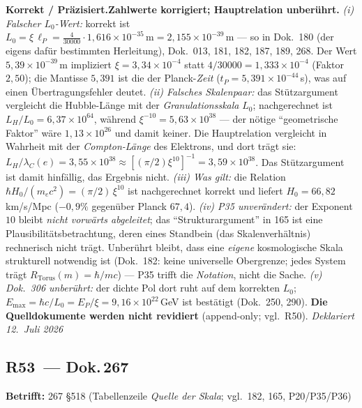 \smallskip\noindent\textbf{Korrekt / Präzisiert.}\quad \textbf{Zahlwerte korrigiert; Hauptrelation unberührt.} \emph{(i) Falscher $L_0$-Wert:} korrekt ist $L_0 = \xi\,\ell_P = \tfrac{4}{30000}\cdot 1{,}616\times10^{-35}\,\text{m} = \boxed{2{,}155\times10^{-39}\,\text{m}}$ --- so in Dok.~180 (der eigens dafür bestimmten Herleitung), Dok.~013, 181, 182, 187, 189, 268. Der Wert $5{,}39\times10^{-39}$\,m impliziert $\xi = 3{,}34\times10^{-4}$ statt $4/30000 = 1{,}333\times10^{-4}$ (Faktor $2{,}50$); die Mantisse $5{,}391$ ist die der Planck-\emph{Zeit} ($t_P = 5{,}391\times10^{-44}$\,s), was auf einen Übertragungsfehler deutet. \emph{(ii) Falsches Skalenpaar:} das Stützargument vergleicht die Hubble-Länge mit der \emph{Granulationsskala} $L_0$; nachgerechnet ist $L_H/L_0 = 6{,}37\times10^{64}$, während $\xi^{-10} = 5{,}63\times10^{38}$ --- der nötige \enquote{geometrische Faktor} wäre $1{,}13\times10^{26}$ und damit keiner. Die Hauptrelation vergleicht in Wahrheit mit der \emph{Compton-Länge} des Elektrons, und dort trägt sie: $L_H/\lambda_C(e) = 3{,}55\times10^{38} \approx [(\pi/2)\xi^{10}]^{-1} = 3{,}59\times10^{38}$. Das Stützargument ist damit hinfällig, das Ergebnis nicht. \emph{(iii) Was gilt:} die Relation $\hbar H_0/(m_e c^2) = (\pi/2)\,\xi^{10}$ ist nachgerechnet korrekt und liefert $H_0 = 66{,}82$\,km/s/Mpc ($-0{,}9\%$ gegenüber Planck $67{,}4$). \emph{(iv) P35 unverändert:} der Exponent $10$ bleibt \emph{nicht vorwärts abgeleitet}; das \enquote{Strukturargument} in 165 ist eine Plausibilitätsbetrachtung, deren eines Standbein (das Skalenverhältnis) rechnerisch nicht trägt. Unberührt bleibt, dass eine \emph{eigene} kosmologische Skala strukturell notwendig ist (Dok.~182: keine universelle Obergrenze; jedes System trägt $R_\text{Torus}(m)=\hbar/mc$) --- P35 trifft die \emph{Notation}, nicht die Sache. \emph{(v) Dok.~306 unberührt:} der dichte Pol dort ruht auf dem korrekten $L_0$; $E_\text{max} = \hbar c/L_0 = E_P/\xi = 9{,}16\times10^{22}$\,GeV ist bestätigt (Dok.~250, 290). \textbf{Die Quelldokumente werden nicht revidiert} (append-only; vgl.\ R50). \emph{Deklariert 12.~Juli 2026}


\medskip


\subsection*{R53~--- Dok.\,267}

\noindent\textbf{Betrifft:} 267 \S518 (Tabellenzeile \emph{Quelle der Skala}; vgl.\ 182, 165, P20/P35/P36)


